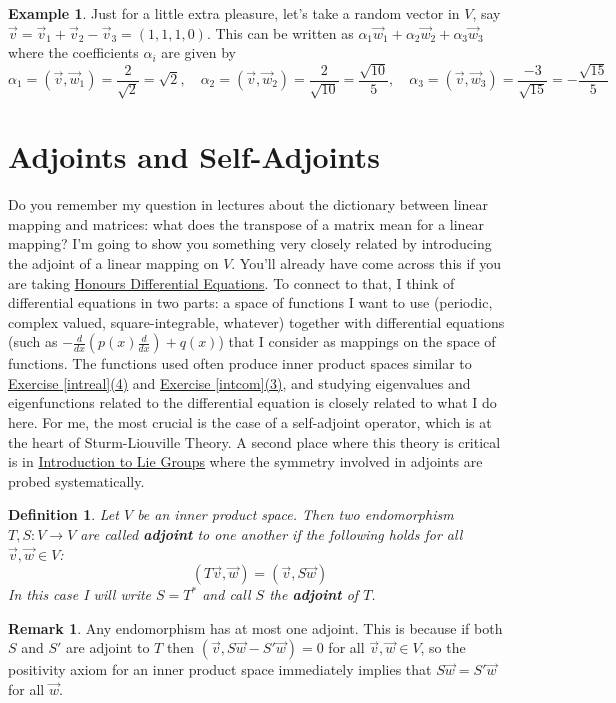 \documentclass[11pt]{amsbook}
\newtheorem{definition}[theorem]{Definition}
\theoremstyle{definition}
\newtheorem{rem}[theorem]{Remark}
\newtheorem{ex}[theorem]{Example}
\begin{document}
\begin{ex}
Just for a little extra pleasure, let's take a random vector in $V$, say $\vec{v} = \vec{v}_1 + \vec{v}_2 - \vec{v}_3 = (1,1,1,0)$. This can be written as $\alpha_1 \vec{w}_1 + \alpha_2 \vec{w}_2 + \alpha_3\vec{w}_3$ where the coefficients $\alpha_i$ are given by $$\alpha_1 = (\vec{v} , \vec{w}_1) = \frac{2}{\sqrt{2}}= \sqrt{2}, \quad \alpha_2 = (\vec{v}, \vec{w}_2) = \frac{2}{\sqrt{10}} = \frac{\sqrt{10}}{5}, \quad \alpha_3 = (\vec{v}, \vec{w}_3) = \frac{-3}{\sqrt{15}} = - \frac{\sqrt{15}}{5}$$
\end{ex}

\section{Adjoints and Self-Adjoints}
Do you remember my question in lectures about the dictionary between linear mapping and matrices: what does the transpose of a matrix mean for a linear mapping? I'm going to show you something very closely related by introducing the adjoint of a linear mapping on $V$. You'll already have come across this if you are taking \href{http://www.drps.ed.ac.uk/14-15/dpt/cxmath10066.htm}{Honours Differential Equations}. To connect to that, I think of differential equations in two parts: a space of functions I want to use (periodic, complex valued, square-integrable, whatever) together with differential equations (such as $- \frac{d}{dx}( p(x) \frac{d}{dx}) + q(x)$) that I consider as mappings on the space of functions. The functions used often produce inner product spaces similar to \hyperref[intreal]{Exercise \ref{intreal}(4)} and \hyperref[intcom]{Exercise \ref{intcom}(3)}, and studying eigenvalues and eigenfunctions related to the differential equation is closely related to what I do here. For me, the most crucial is the case of a self-adjoint operator, which is at the heart of Sturm-Liouville Theory. A second place where this theory is critical is in \href{http://www.drps.ed.ac.uk/14-15/dpt/cxmath11053.htm}{Introduction to Lie Groups} where the symmetry involved in adjoints are probed systematically.

\begin{definition} Let $V$ be an inner product space. Then two endomorphism $T, S: V\to V$ are called {\bf adjoint} to one another if the following holds for all $\vec{v}, \vec{w} \in V$: $$( T\vec{v}, \vec{w}) = (\vec{v}, S\vec{w})$$ In this case I will write $S = T^{\ast}$ and call $S$ the {\bf adjoint} of $T$.
\end{definition}

\begin{rem}
Any endomorphism has at most one adjoint. This is because if both $S$ and $S'$ are adjoint to $T$ then $(\vec{v}, S\vec{w} - S' \vec{w}) = 0$ for all $\vec{v}, \vec{w} \in V$, so the positivity axiom for an inner product space immediately implies that $S\vec{w} = S'\vec{w}$ for all $\vec{w}$.
\end{rem}
\end{document}
